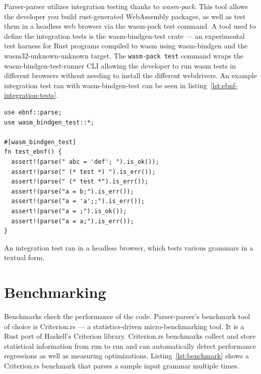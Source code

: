 \documentclass[english,engineering]{wizthesis}
\newcommand{\thisproject}{Parser-parser}
\begin{document}
\thisproject{} utilizes integration testing thanks to \emph{wasm-pack}. This
tool allows the developer you build rust-generated WebAssembly packages, as well
as test them in a headless web browser via the wasm-pack test command. A tool
used to define the integration tests is the wasm-bindgen-test crate --- an
experimental test harness for Rust programs compiled to wasm using wasm-bindgen
and the wasm32-unknown-unknown target. The \texttt{wasm-pack test} command wraps
the wasm-bindgen-test-runner CLI allowing the developer to run wasm tests in
different browsers without needing to install the different webdrivers. An
example integration test ran with wasm-bindgen-test can be seen in
listing~\ref{lst:ebnf-integration-tests}.

\begin{listing}[H]
  \begin{verbatim}
use ebnf::parse;
use wasm_bindgen_test::*;

#[wasm_bindgen_test]
fn test_ebnf() {
  assert!(parse(" abc = 'def'; ").is_ok());
  assert!(parse(" (* test *) ").is_err());
  assert!(parse(" (* test *").is_err());
  assert!(parse("a = b;").is_err());
  assert!(parse("a = 'a';;").is_err());
  assert!(parse("a = ;").is_ok());
  assert!(parse("a = a;").is_err());
}
  \end{verbatim}
  \caption{An integration test ran in a headless browser, which tests various
  grammars in a textual form.}
  \label{lst:ebnf-integration-tests}
\end{listing}

\section{Benchmarking}

Benchmarks check the performance of the code. \thisproject{}'s benchmark tool of
choice is Criterion.rs --- a statistics-driven micro-benchmarking tool. It is a
Rust port of Haskell's Criterion library. Criterion.rs benchmarks collect and
store statistical information from run to run and can automatically detect
performance regressions as well as measuring optimizations.
Listing~\ref{lst:benchmark} shows a Criterion.rs benchmark that parses a sample
input grammar multiple times.
\end{document}
